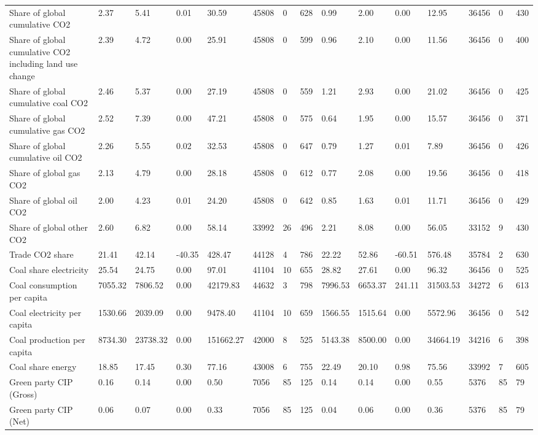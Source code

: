 \begin{longtable}{lllllllllllllll}
Share of global cumulative CO2 & 2.37 & 5.41 & 0.01 & 30.59 & 45808 & 0 & 628 & 0.99 & 2.00 & 0.00 & 12.95 & 36456 & 0 & 430\\
Share of global cumulative CO2 including land use change & 2.39 & 4.72 & 0.00 & 25.91 & 45808 & 0 & 599 & 0.96 & 2.10 & 0.00 & 11.56 & 36456 & 0 & 400\\
Share of global cumulative coal CO2 & 2.46 & 5.37 & 0.00 & 27.19 & 45808 & 0 & 559 & 1.21 & 2.93 & 0.00 & 21.02 & 36456 & 0 & 425\\
Share of global cumulative gas CO2 & 2.52 & 7.39 & 0.00 & 47.21 & 45808 & 0 & 575 & 0.64 & 1.95 & 0.00 & 15.57 & 36456 & 0 & 371\\
\addlinespace
Share of global cumulative oil CO2 & 2.26 & 5.55 & 0.02 & 32.53 & 45808 & 0 & 647 & 0.79 & 1.27 & 0.01 & 7.89 & 36456 & 0 & 426\\
Share of global gas CO2 & 2.13 & 4.79 & 0.00 & 28.18 & 45808 & 0 & 612 & 0.77 & 2.08 & 0.00 & 19.56 & 36456 & 0 & 418\\
Share of global oil CO2 & 2.00 & 4.23 & 0.01 & 24.20 & 45808 & 0 & 642 & 0.85 & 1.63 & 0.01 & 11.71 & 36456 & 0 & 429\\
Share of global other CO2 & 2.60 & 6.82 & 0.00 & 58.14 & 33992 & 26 & 496 & 2.21 & 8.08 & 0.00 & 56.05 & 33152 & 9 & 430\\
Trade CO2 share & 21.41 & 42.14 & -40.35 & 428.47 & 44128 & 4 & 786 & 22.22 & 52.86 & -60.51 & 576.48 & 35784 & 2 & 630\\
\addlinespace
Coal share electricity & 25.54 & 24.75 & 0.00 & 97.01 & 41104 & 10 & 655 & 28.82 & 27.61 & 0.00 & 96.32 & 36456 & 0 & 525\\
Coal consumption per capita & 7055.32 & 7806.52 & 0.00 & 42179.83 & 44632 & 3 & 798 & 7996.53 & 6653.37 & 241.11 & 31503.53 & 34272 & 6 & 613\\
Coal electricity per capita & 1530.66 & 2039.09 & 0.00 & 9478.40 & 41104 & 10 & 659 & 1566.55 & 1515.64 & 0.00 & 5572.96 & 36456 & 0 & 542\\
Coal production per capita & 8734.30 & 23738.32 & 0.00 & 151662.27 & 42000 & 8 & 525 & 5143.38 & 8500.00 & 0.00 & 34664.19 & 34216 & 6 & 398\\
Coal share energy & 18.85 & 17.45 & 0.30 & 77.16 & 43008 & 6 & 755 & 22.49 & 20.10 & 0.98 & 75.56 & 33992 & 7 & 605\\
\addlinespace
Green party CIP (Gross) & 0.16 & 0.14 & 0.00 & 0.50 & 7056 & 85 & 125 & 0.14 & 0.14 & 0.00 & 0.55 & 5376 & 85 & 79\\
Green party CIP (Net) & 0.06 & 0.07 & 0.00 & 0.33 & 7056 & 85 & 125 & 0.04 & 0.06 & 0.00 & 0.36 & 5376 & 85 & 79\\

\end{longtable}
